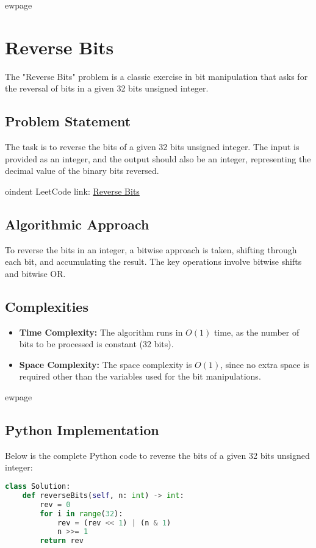 
ewpage
\chapter{Reverse Bits}
\label{chap:Reverse_Bits}

The "Reverse Bits" problem is a classic exercise in bit manipulation that asks for the reversal of bits in a given 32 bits unsigned integer.

\section*{Problem Statement}
The task is to reverse the bits of a given 32 bits unsigned integer. The input is provided as an integer, and the output should also be an integer, representing the decimal value of the binary bits reversed.


oindent
LeetCode link: \href{https://leetcode.com/problems/reverse-bits/}{Reverse Bits}

\section*{Algorithmic Approach}
To reverse the bits in an integer, a bitwise approach is taken, shifting through each bit, and accumulating the result. The key operations involve bitwise shifts and bitwise OR.

\section*{Complexities}
\begin{itemize}
	\item \textbf{Time Complexity:} The algorithm runs in \(O(1)\) time, as the number of bits to be processed is constant (32 bits).
	\item \textbf{Space Complexity:} The space complexity is \(O(1)\), since no extra space is required other than the variables used for the bit manipulations.
\end{itemize}


ewpage %
\section*{Python Implementation}
Below is the complete Python code to reverse the bits of a given 32 bits unsigned integer:

\begin{fullwidth}
\begin{lstlisting}[language=Python]
class Solution:
    def reverseBits(self, n: int) -> int:
        rev = 0
        for i in range(32):
            rev = (rev << 1) | (n & 1)
            n >>= 1
        return rev
\end{lstlisting}

\end{fullwidth}

